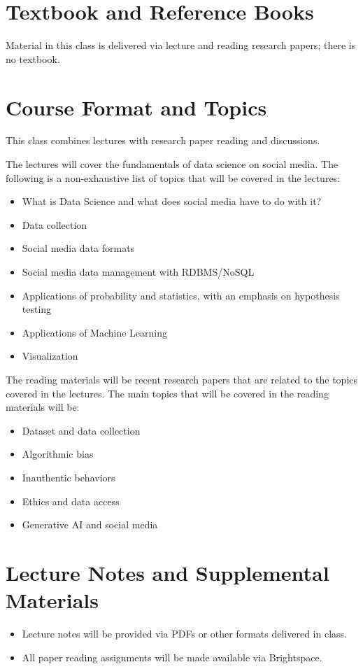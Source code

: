 \documentclass[11pt,article,oneside]{memoir} %
\begin{document}

\section{Textbook and Reference Books}

Material in this class is delivered via lecture and reading research papers; there is no
textbook.

\section{Course Format and Topics}

This class combines lectures with research paper reading and discussions.

The lectures will cover the fundamentals of data science on social media.
The following is a non-exhaustive list of topics that will be covered in the lectures:

\begin{itemize}
    \item What is Data Science and what does social media have to do with it?
    \item Data collection
    \item Social media data formats
    \item Social media data management with RDBMS/NoSQL
    \item Applications of probability and statistics, with an emphasis on hypothesis testing
    \item Applications of Machine Learning
    \item Visualization
\end{itemize}

The reading materials will be recent research papers that are related to the topics covered in the lectures.
The main topics that will be covered in the reading materials will be:

\begin{itemize}
    \item Dataset and data collection
    \item Algorithmic bias
    \item Inauthentic behaviors
    \item Ethics and data access
    \item Generative AI and social media
\end{itemize}


\section{Lecture Notes and Supplemental Materials}
\begin{itemize}
    \item Lecture notes will be provided via PDFs or other formats delivered in class.
    \item All paper reading assignments will be made available via Brightspace.
\end{itemize}
\end{document}
